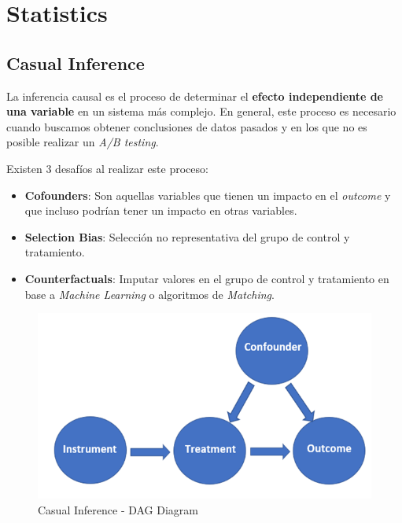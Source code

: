 \section{Statistics}

\subsection{Casual Inference}

La inferencia causal es el proceso de determinar el \textbf{efecto independiente de una variable} en un sistema más complejo. En general, este proceso es necesario cuando buscamos obtener conclusiones de datos pasados y en los que no es posible realizar un \textit{A/B testing}.

Existen 3 desafíos al realizar este proceso: 
\begin{itemize}
    \item \textbf{Cofounders}: Son aquellas variables que tienen un impacto en el \textit{outcome} y que incluso podrían tener un impacto en otras variables. 
    \item \textbf{Selection Bias}: Selección no representativa del grupo de control y tratamiento.
    \item \textbf{Counterfactuals}: Imputar valores en el grupo de control y tratamiento en base a \textit{Machine Learning} o algoritmos de \textit{Matching}. 
\end{itemize}

\begin{figure}[H]
    \center
    \includegraphics[scale=0.3]{notebooks/STATS/img/casual_inference_diagram.png}
    \caption{Casual Inference - DAG Diagram}
\end{figure}

